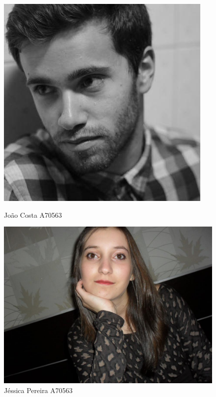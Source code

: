 \documentclass{article}
\begin{document}
\begin{titlepage}
\begin{figure}[!htb]
  \includegraphics[width=\linewidth]{adelino.jpg}
  \caption*{João Costa A70563}\label{fig:awesome_image1}
\endminipage\hfill
{}
  \includegraphics[width=\linewidth]{jessica0.jpg}
  \caption*{Jéssica Pereira A70563}\label{fig:awesome_image2}
\endminipage\hfill
{}%

\end{figure}
\end{titlepage}
\end{document}

